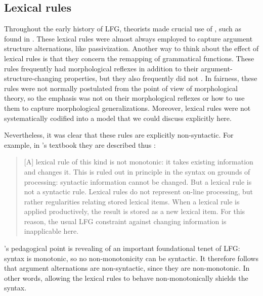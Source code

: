 \documentclass[output=paper,hidelinks]{langscibook}
\begin{document}
\subsection{Lexical rules}
\label{sec:Morph:lexical-rules}

Throughout the early history of LFG, theorists made crucial use of
, such as found in \citet{bresnan1982the-passive}.  These
lexical rules were almost always employed to capture argument
structure alternations, like passivization. Another way to think
about the effect of lexical rules is that they concern the remapping
of grammatical functions.  These rules frequently had morphological
reflexes in addition to their argument-structure-changing properties,
but they also frequently did not \citep[see the example lexical rules
for gerundives in][316--317]{BresnanEtAl2016}. In
fairness, these rules were not normally postulated from the point of
view of morphological theory, so the emphasis was not on their
morphological reflexes or how to use them to capture morphological
generalizations. Moreover, lexical rules were not systematically
codified into a model that we could discuss explicitly here.


Nevertheless, it was clear that these rules
are explicitly non-syntactic.  For example, in \citeauthor{falk2001lexical}’s
textbook they are described thus \citep[93]{falk2001lexical}:
\begin{quote}
[A] lexical rule of this kind is not monotonic: it takes existing
information and changes it. This is ruled out in principle in the
syntax on grounds of processing: syntactic information cannot be
changed. But a lexical rule is not a syntactic rule. Lexical rules do
not represent on-line processing, but rather regularities relating
stored lexical items. When a lexical rule is applied productively, the
result is stored as a new lexical item. For this reason, the usual LFG
constraint against changing information is inapplicable here. 
\end{quote}
%
\citeauthor{falk2001lexical}'s pedagogical point is revealing of an important
foundational tenet of LFG: syntax is monotonic, so no non-monotonicity
can be syntactic. It therefore follows that argument alternations are
non-syntactic, since they are non-monotonic. In other words, allowing the
lexical rules to behave non-monotonically shields the syntax. 
\end{document}
